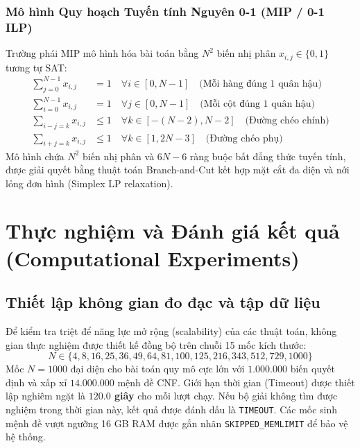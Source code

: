 \documentclass[a4paper,fleqn]{cas-sc}
\begin{document}
\subsubsection{Mô hình Quy hoạch Tuyến tính Nguyên 0-1 (MIP / 0-1 ILP)}
Trường phái MIP mô hình hóa bài toán bằng $N^2$ biến nhị phân $x_{i,j} \in \{0, 1\}$ tương tự SAT:
\begin{align}
\sum_{j=0}^{N-1} x_{i,j} &= 1 \quad \forall i \in [0, N-1] \quad \text{(Mỗi hàng đúng 1 quân hậu)} \\
\sum_{i=0}^{N-1} x_{i,j} &= 1 \quad \forall j \in [0, N-1] \quad \text{(Mỗi cột đúng 1 quân hậu)} \\
\sum_{i-j=k} x_{i,j} &\le 1 \quad \forall k \in [-(N-2), N-2] \quad \text{(Đường chéo chính)} \\
\sum_{i+j=k} x_{i,j} &\le 1 \quad \forall k \in [1, 2N-3] \quad \text{(Đường chéo phụ)}
\end{align}
Mô hình chứa $N^2$ biến nhị phân và $6N - 6$ ràng buộc bất đẳng thức tuyến tính, được giải quyết bằng thuật toán Branch-and-Cut kết hợp mặt cắt đa diện và nới lỏng đơn hình (Simplex LP relaxation).

\section{Thực nghiệm và Đánh giá kết quả (Computational Experiments)}
\label{sec:experiments}

\subsection{Thiết lập không gian đo đạc và tập dữ liệu}
\label{subsec:dataset_settings}
Để kiểm tra triệt để năng lực mở rộng (scalability) của các thuật toán, không gian thực nghiệm được thiết kế đồng bộ trên chuỗi 15 mốc kích thước:
\begin{equation}
N \in \{4, 8, 16, 25, 36, 49, 64, 81, 100, 125, 216, 343, 512, 729, 1000\}
\end{equation}
Mốc $N = 1000$ đại diện cho bài toán quy mô cực lớn với $1.000.000$ biến quyết định và xấp xỉ $14.000.000$ mệnh đề CNF. Giới hạn thời gian (Timeout) được thiết lập nghiêm ngặt là \textbf{$120.0$ giây} cho mỗi lượt chạy. Nếu bộ giải không tìm được nghiệm trong thời gian này, kết quả được đánh dấu là \texttt{TIMEOUT}. Các mốc sinh mệnh đề vượt ngưỡng 16 GB RAM được gắn nhãn \texttt{SKIPPED\_MEMLIMIT} để bảo vệ hệ thống.
\end{document}
